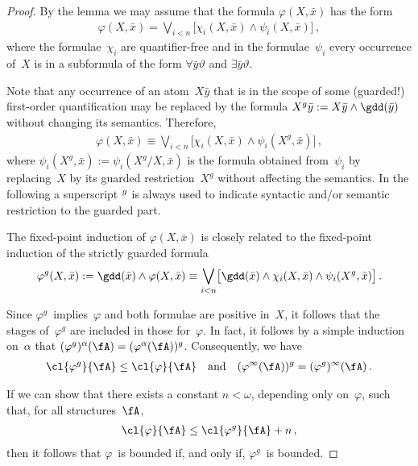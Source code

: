 \documentclass{LMCS}
\begin{document}
\begin{proof}
By the lemma we may assume that the formula $\varphi(X,\bar x)$ has the form
\begin{align*}
  \varphi(X,\bar x) = \bigvee_{i < n}\bigl[\chi_i(X,\bar x) \land \psi_i(X,\bar x)\bigr]\,,
\end{align*}
where the formulae~$\chi_i$ are quantifier-free
and in the formulae~$\psi_i$ every occurrence of~$X$ is in a subformula
of the form $\forall\bar y\vartheta$ and $\exists\bar y\vartheta$.

Note that any occurrence of an atom~$X\bar y$ that is in the
scope of some (guarded\?!) first-order quantification may be replaced by the formula
$X^g\bar y := X\bar y \land \gdd(\bar y)$ without changing its semantics.
Therefore,
\begin{align*}
  \varphi(X,\bar x) \equiv \bigvee_{i < n}\bigl[\chi_i(X,\bar x) \land \psi_i(X^g,\bar x)\bigr]\,,
\end{align*}
where $\psi_i(X^g,\bar x) := \psi_i(X^g/X,\bar x)$ is the formula obtained from~$\psi_i$
by replacing~$X$ by its guarded restriction~$X^g$ without affecting the semantics.
In the following a superscript $\rule{0pt}{1.5ex}^g$
is always used to indicate syntactic and/or semantic restriction to
the guarded part.

The fixed-point induction of $\varphi(X,\bar x)$
is closely related to the fixed-point induction of the strictly guarded formula
\begin{align*}
  \varphi^g(X,\bar x) :=
    \gdd(\bar x) \wedge \varphi(X,\bar x)
    \equiv \bigvee_{i<n} \bigl[\gdd(\bar x) \wedge \chi_i(X,\bar x)
                                            \wedge \psi_i(X^g,\bar x) \bigr]\,.
\end{align*}

Since $\varphi^g$~implies~$\varphi$ and both formulae are positive in~$X$,
it follows that the stages of~$\varphi^g$ are included in those for~$\varphi$.
In fact, it follows by a simple induction on~$\alpha$ that
$(\varphi^g)^\alpha(\fA) = (\varphi^\alpha(\fA))^g$.
Consequently, we have
\begin{align*}
  \cl{\varphi^g}{\fA} \leq \cl{\varphi}{\fA}
  \quad\text{and}\quad
  (\varphi^\infty(\fA))^g = (\varphi^g)^\infty(\fA)\,.
\end{align*}

If we can show that there exists a constant $n < \omega$, depending only on~$\varphi$,
such that, for all structures~$\fA$,
\begin{align*}
  \cl{\varphi}{\fA} \leq \cl{\varphi^g}{\fA} + n\,,
\end{align*}
then it follows that $\varphi$~is bounded if, and only if, $\varphi^g$~is bounded.


\end{proof}
\end{document}
